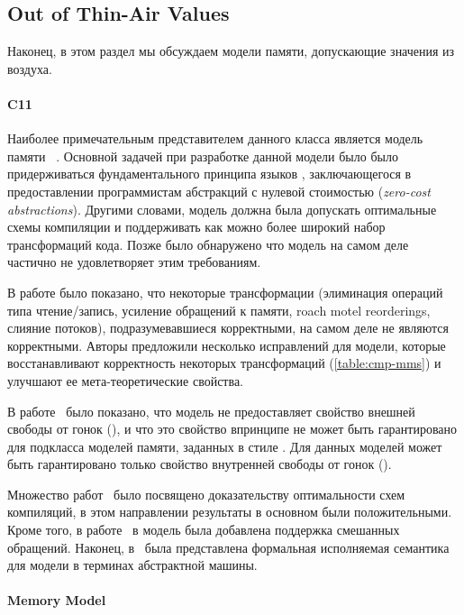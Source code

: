 \subsection{Out of Thin-Air Values}

Наконец, в этом раздел мы обсуждаем модели памяти, 
допускающие значения из воздуха. 

\paragraph{C11}

Наиболее примечательным представителем данного класса 
является модель памяти \CMM~\cite{Batty-al:POPL11}.
Основной задачей при разработке данной модели было 
было придерживаться фундаментального принципа языков \CPP, 
заключающегося в предоставлении программистам 
абстракций с нулевой стоимостью (\emph{zero-cost abstractions}).
Другими словами, модель \CMM должна была допускать
оптимальные схемы компиляции и поддерживать
как можно более широкий набор трансформаций кода. 
Позже было обнаружено что модель на самом деле 
частично не удовлетворяет этим требованиям. 


В работе \cite{Vafeiadis-al:POPL15} было показано, что некоторые трансформации 
(элиминация операций типа чтение/запись, усиление обращений к памяти,
roach motel reorderings, слияние потоков), 
подразумевавшиеся корректными, на самом деле не являются корректными.
Авторы предложили несколько исправлений для модели, 
которые восстанавливают корректность некоторых трансформаций (\see \cref{table:cmp-mms})
и улучшают ее мета-теоретические свойства. 

В работе~\cite{Batty-al:ESOP15} было показано, 
что модель не предоставляет свойство внешней свободы от гонок (\eDRF), 
и что это свойство впринципе не может быть гарантировано 
для подкласса моделей памяти, заданных в стиле \CMM.
Для данных моделей может быть гарантировано 
только свойство внутренней свободы от гонок (\iDRF).

Множество работ~\cite{Batty-al:POPL11, Sarkar-al:PLDI12, Batty-al:POPL12, Batty-al:POPL16} 
было посвящено доказательству оптимальности схем компиляций, 
в этом направлении результаты в основном были положительными. 
Кроме того, в работе~\cite{Flur-al:POPL17} в модель была 
добавлена поддержка смешанных обращений. 
Наконец, в~\cite{Nienhuis-al:OOPSLA16} была представлена 
формальная исполняемая семантика для модели \CMM в терминах абстрактной машины.  

\paragraph{\JS Memory Model}


